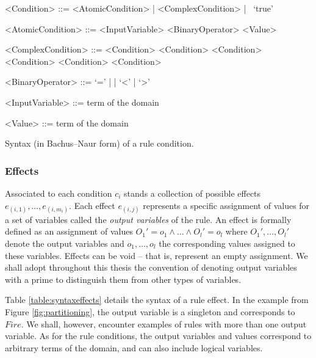 \setlength{\grammarindent}{12em} 

\begin{table}[h]
\vspace{3mm}
\begin{grammar}

<Condition> ::= <AtomicCondition> | <ComplexCondition> | \ `true'

<AtomicCondition> ::= <InputVariable> <BinaryOperator> <Value>

<ComplexCondition> ::= \lit{(} <Condition> \lit{)} 
\alt \lit{$\lnot$} <Condition> 
\alt <Condition> \lit{$\land$} <Condition> 
\alt <Condition> \lit{$\lor$} <Condition>

<BinaryOperator> ::= `=' | \lit{$\neq$} | `\textless' | `\textgreater'

<InputVariable> ::= term of the domain

<Value> ::= term  of the domain

\end{grammar}
\caption{Syntax (in Bachus--Naur form) of a rule condition.}
\label{table:syntaxconditions}
\end{table}

\subsubsection*{Effects}

Associated to each condition $c_i$ stands a collection of possible effects $e_{(i,1)}, \dots, e_{(i,m_i)}$. Each effect $e_{(i,j)}$ represents a specific assignment of values for a set of variables called the \textit{output variables} of the rule.  An effect is formally defined as an assignment of values $O_1'\!=\!o_1 \land \dots \land O_{l}'\!=\!o_{l}$ where $O_1', \dots, O_{l}'$ denote the output variables and $o_1, \dots, o_{l}$ the corresponding values assigned to these variables. Effects can be void -- that is, represent an empty assignment. We shall adopt throughout this thesis the convention of denoting output variables with a prime to distinguish them from other types of variables. 

Table \ref{table:syntaxeffects} details the syntax of a rule effect. In the example from Figure \ref{fig:partitioning}, the output variable is a singleton and corresponds to $Fire$. We shall, however, encounter examples of rules with more than one output variable. As for the rule conditions, the output variables and values correspond to arbitrary terms of the domain, and can also include logical variables. 


